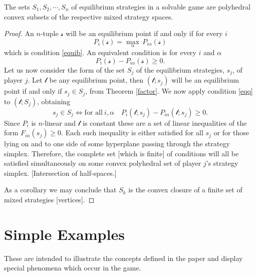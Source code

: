 \begin{theorem}
    The sets $S_1 ,S_2,\cdots ,S_n $ of equilibrium strategies in a solvable game are polyhedral convex subsets of the respective mixed strategy spaces. 
\end{theorem}
\begin{proof}
    An $n$-tuple $\mathcal{s} $ will be an equilibrium point if and only if for every $i$ 
    \begin{equation}
        P_i (\mathcal{s} ) = \underset{\alpha }{\max} \, P_{i\alpha }(\mathcal{s} )
    \end{equation}
    which is condition \eqref{equib}. An equivalent condition is for every $i$ and $\alpha $ 
    \begin{equation}\label{eqq}
        P_i (\mathcal{s} ) - P_{i\alpha }(\mathcal{s} ) \geq 0.
    \end{equation}
    Let us now consider the form of the set $S_j $ of the equilibrium strategies, $s_j $, of player $j$. Let $\mathcal{t} $ be any equilibrium point, then $(\mathcal{t} ;s_j )$ will be an equilibrium point if and only if $s_j \in S_j $, from Theorem \eqref{factor}. We now apply condition \eqref{eqq} to $(\mathcal{t} ;S_j )$, obtaining
    \begin{equation}
        s_j \in S_j  \iff \text{for all} \ i,\alpha \quad P_i (\mathcal{t} ;s_j )-P_{i\alpha }(\mathcal{t} ;s_j )\geq 0.
    \end{equation}
    Since $P_i $ is $n$-linear and $\mathcal{t} $ is constant these are a set of linear inequalities of the form $F_{i\alpha }(s_j )\geq 0$. Each such inequality is either satisfied for all $s_j $ or for those lying on and to one side of some hyperplane passing through the strategy simplex. Therefore, the complete set [which is finite] of conditions will all be satisfied simultaneously on some convex polyhedral set of player $j$'s strategy simplex. [Intersection of half-spaces.]

    As a corollary we may conclude that $S_k $ is the convex closure of a finite set of mixed strategies [vertices].
\end{proof}
\section*{Simple Examples}
\hspace{\parindent}These are intended to illustrate the concepts defined in the paper and display special phenomena which occur in the game.

